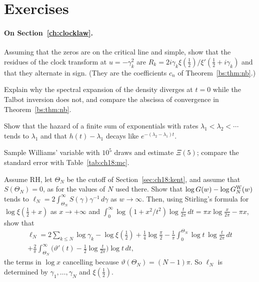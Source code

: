 \section{Exercises}\label{chap:probability:ex}

\paragraph{On Section~\ref{ch:clocklaw}.}
\begin{exercises}
\item\label{ex:ch18:residues} Assuming that the zeros are on the critical line and simple, show that the residues of the clock transform at $u=-\gamma_k^2$ are $R_k=2i\gamma_k\xi(\frac12)/\xi'(\frac12+i\gamma_k)$ and that they alternate in sign. (They are the coefficients $c_n$ of Theorem~\ref{bs:thm:nb}.)
\item\label{ex:ch18:origin} Explain why the spectral expansion of the density diverges at $t=0$ while the Talbot inversion does not, and compare the abscissa of convergence in Theorem~\ref{bs:thm:nb}.
\item\label{ex:ch18:hazard} Show that the hazard of a finite sum of exponentials with rates $\lambda_1<\lambda_2<\cdots$ tends to $\lambda_1$ and that $h(t)-\lambda_1$ decays like $e^{-(\lambda_2-\lambda_1)t}$.
\item Sample Williams' variable with $10^5$ draws and estimate $\Xi(5)$; compare the standard error with Table~\ref{tab:ch18:mc}.
\item\label{ex:ch18:floor} Assume RH, let $\Theta_N$ be the cutoff of Section~\ref{sec:ch18:kent}, and assume that $S(\Theta_N)=0$, as for the values of $N$ used there. Show that $\log G(w)-\log G_N^{\rm W}(w)$ tends to $\ell_N=2\int_{\Theta_N}^\infty S(\gamma)\gamma^{-1}\,d\gamma$ as $w\to\infty$. Then, using Stirling's formula for $\log\xi(\frac12+x)$ as $x\to+\infty$ and $\int_0^\infty\log(1+x^2/t^2)\log\frac t{2\pi}\,dt=\pi x\log\frac x{2\pi}-\pi x$, show that
\begin{multline*}
\ell_N=2\sum_{k\le N}\log\gamma_k-\log\xi(\tfrac12)+\tfrac14\log\tfrac\pi2-\frac1\pi\int_0^{\Theta_N}\log t\,\log\frac t{2\pi}\,dt\\
+\frac2\pi\int_{\Theta_N}^\infty\Big(\vartheta'(t)-\frac12\log\frac t{2\pi}\Big)\log t\,dt,
\end{multline*}
the terms in $\log x$ cancelling because $\vartheta(\Theta_N)=(N-1)\pi$. So $\ell_N$ is determined by $\gamma_1,\dots,\gamma_N$ and $\xi(\frac12)$.
\end{exercises}

